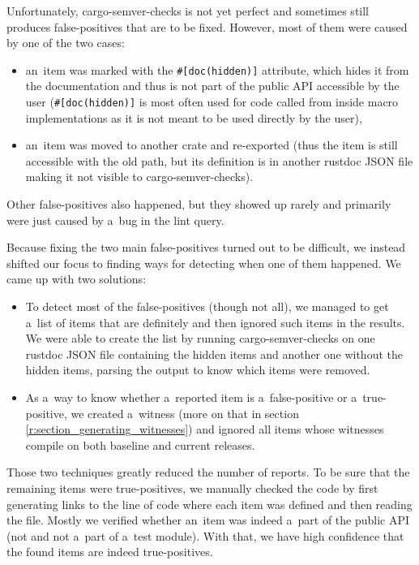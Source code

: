 \documentclass[licencjacka,en]{pracamgr}
\begin{document}
Unfortunately, cargo-semver-checks is not yet perfect and sometimes still produces false-positives
that are to be fixed. However, most of them were caused by one of the two cases:
\begin{itemize}
	\item an~item was marked with the \texttt{\#[doc(hidden)]} attribute,
		which hides it from the documentation and thus is not part
		of the public API accessible by the user
		(\texttt{\#[doc(hidden)]} is most often used for code called from inside macro
		implementations as it is not meant to be used directly by the user),
	\item an~item was moved to another crate and re-exported
		(thus the item is still accessible with the old path,
		but its definition is in another rustdoc JSON file making it not visible
		to cargo-semver-checks).
\end{itemize}
Other false-positives also happened, but they showed up rarely and primarily
were just caused by a~bug in the lint query.

Because fixing the two main false-positives turned out to be difficult, we instead shifted
our focus to finding ways for detecting when one of them happened.
We came up with two solutions:
\begin{itemize}
	\item To detect most of the  false-positives
		(though not all), we managed to get a~list of items that are definitely
		 and then ignored such items in the results.
		We were able to create the list by running cargo-semver-checks on one rustdoc JSON file
		containing the hidden items and another one without the hidden items,
		parsing the output to know which items were removed.
	\item As a~way to know whether a~reported item is a~false-positive or a~true-positive,
		we created a~witness (more on that in section \ref{r:section_generating_witnesses})
		and ignored all items whose witnesses compile on both baseline and current releases.
\end{itemize}

Those two techniques greatly reduced the number of reports.
To be sure that the remaining items were true-positives,
we manually checked the code by first generating links to the line of code where each item
was defined and then reading the file.
Mostly we verified whether an~item was indeed a~part of the public API
(not  and not a~part of a~test module).
With that, we have high confidence that the found items are indeed true-positives.
\end{document}
